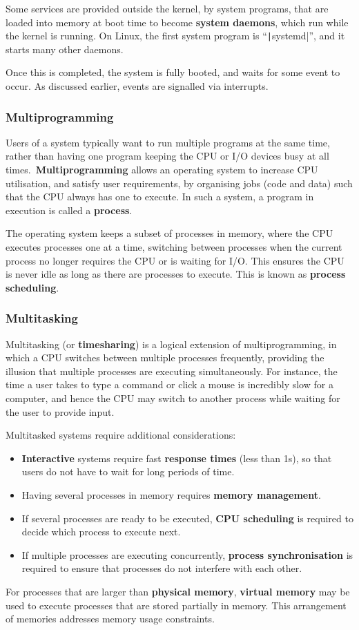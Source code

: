 \documentclass{article}
\begin{document}
Some services are provided outside the kernel, by system programs,
that are loaded into memory at boot time to become \textbf{system
daemons}, which run while the kernel is running. On Linux, the first
system program is ``\texttt|systemd|'', and it starts many
other daemons.

Once this is completed, the system is fully booted, and waits for some
event to occur. As discussed earlier, events are signalled via
interrupts.
\subsubsection{Multiprogramming}
Users of a system typically want to run multiple programs at the same
time, rather than having one program keeping the CPU or I/O devices
busy at all times.\ \textbf{Multiprogramming} allows an operating
system to increase CPU utilisation, and satisfy user requirements, by
organising jobs (code and data) such that the CPU always has one to
execute. In such a system, a program in execution is called a
\textbf{process}.

The operating system keeps a subset of processes in memory, where the
CPU executes processes one at a time, switching between processes when
the current process no longer requires the CPU or is waiting for I/O.
This ensures the CPU is never idle as long as there are processes to
execute. This is known as \textbf{process scheduling}.
\subsubsection{Multitasking}
Multitasking (or \textbf{timesharing}) is a logical extension of
multiprogramming, in which a CPU switches between multiple processes
frequently, providing the illusion that multiple processes are
executing simultaneously. For instance, the time a user takes to type a
command or click a mouse is incredibly slow for a computer, and hence
the CPU may switch to another process while waiting for the user to
provide input.

Multitasked systems require additional considerations:
\begin{itemize}
    \item \textbf{Interactive} systems require fast
          \textbf{response times} (less than 1s), so that
          users do not have to wait for long periods of time.
    \item Having several processes in memory requires \textbf{memory
          management}.
    \item If several processes are ready to be executed, \textbf{CPU
          scheduling} is required to decide which process to execute
          next.
    \item If multiple processes are executing concurrently,
          \textbf{process synchronisation} is required to ensure that
          processes do not interfere with each other.
\end{itemize}
For processes that are larger than \textbf{physical memory},
\textbf{virtual memory} may be used to execute processes that are
stored partially in memory.
This arrangement of memories addresses memory usage constraints.
\end{document}
